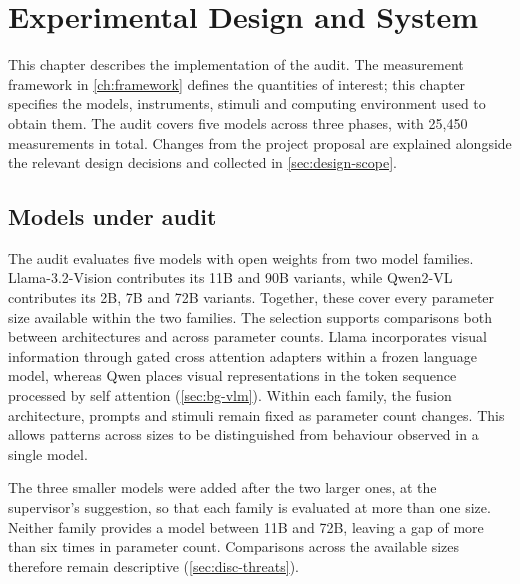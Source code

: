 \chapter{Experimental Design and System}\label{ch:design}

This chapter describes the implementation of the audit. The measurement
framework in \cref{ch:framework} defines the quantities of interest; this
chapter specifies the models, instruments, stimuli and computing environment
used to obtain them. The audit covers five models across three phases, with
25,450 measurements in total. Changes from the project proposal are explained
alongside the relevant design decisions and collected in
\cref{sec:design-scope}.

\section{Models under audit}\label{sec:design-models}

The audit evaluates five models with open weights from two model families.
Llama-3.2-Vision contributes its 11B and 90B variants, while Qwen2-VL
contributes its 2B, 7B and 72B variants. Together, these cover every parameter
size available within the two families. The selection supports comparisons
both between architectures and across parameter counts. Llama incorporates
visual information through gated cross attention adapters within a frozen
language model, whereas Qwen places visual representations in the token
sequence processed by self attention (\cref{sec:bg-vlm}). Within each family,
the fusion architecture, prompts and stimuli remain fixed as parameter count
changes. This allows patterns across sizes to be distinguished from behaviour
observed in a single model.

The three smaller models were added after the two larger ones, at the
supervisor's suggestion, so that each family is evaluated at more than one
size. Neither family provides a model between 11B and 72B, leaving a gap of
more than six times in parameter count. Comparisons across the available
sizes therefore remain descriptive (\cref{sec:disc-threats}).

